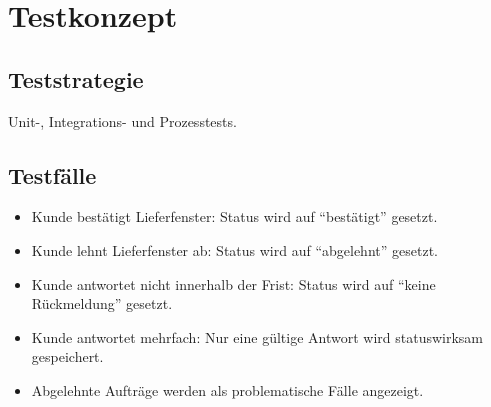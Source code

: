 \documentclass[12pt,a4paper]{article}
\begin{document}
\section{Testkonzept}
\subsection{Teststrategie}
Unit-, Integrations- und Prozesstests.

\subsection{Testfälle}
\begin{itemize}
    \item Kunde bestätigt Lieferfenster: Status wird auf ``bestätigt'' gesetzt.
    \item Kunde lehnt Lieferfenster ab: Status wird auf ``abgelehnt'' gesetzt.
    \item Kunde antwortet nicht innerhalb der Frist: Status wird auf ``keine Rückmeldung'' gesetzt.
    \item Kunde antwortet mehrfach: Nur eine gültige Antwort wird statuswirksam gespeichert.
    \item Abgelehnte Aufträge werden als problematische Fälle angezeigt.
\end{itemize}
\end{document}
